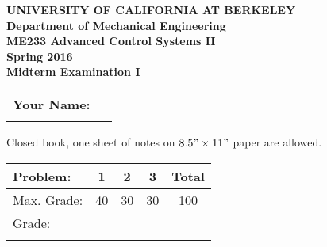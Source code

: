 \documentclass[letterpaper,12pt]{article}
\begin{document}
\begin{center}
    {\bf UNIVERSITY OF CALIFORNIA AT BERKELEY}\\
    {\bf Department of Mechanical Engineering}\\
    {\bf ME233  Advanced Control Systems II\\
    Spring 2016} \\ \vspace{2ex}
    {\Large \bf{ Midterm Examination I }}
\end{center}

\begin{tabular}{|l l|}
    \hline
    {\bf Your Name:} & \hspace{4in}$\:$\\
    $\:$ & $\:$\\
    \hline
\end{tabular}

$\:$\\

\noindent
Closed book, one sheet of notes on $8.5" \times 11"$ paper are allowed. \\

\begin{tabular}{|l | c | c | c| c |  }
    \hline
    Problem: & 1 & 2 & 3   &Total \\ \hline
    Max. Grade: & 40 & 30 & 30 & 100 \\ \hline
    Grade: & \hspace{.5in} &\hspace{.5in} &\hspace{.5in}  &\hspace{.5in}  \\
    & & & & \\
    \hline
\end{tabular}



\newpage $\,$ \newpage

\newpage $\,$ \newpage

\newpage $\,$ \newpage
\end{document}

